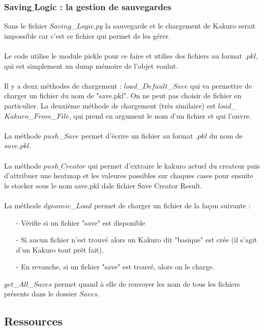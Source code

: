 \documentclass[french,12pt]{article}
\begin{document}
\subsubsection{Saving$\_$Logic : la gestion de sauvegardes}
Sans le fichier $Saving$\_$Logic.py$ la sauvegarde et le chargement de Kakuro serait impossible car c'est ce fichier qui permet de les gérer. \\ \\
Le code utilise le module pickle pour ce faire et utilise des fichiers au format $.pkl$, qui est simplement un dump mémoire de l'objet voulut.  \\ \\
Il y a deux méthodes de chargement : $load$\_$Default$\_$Save$ qui va permettre de charger un fichier du nom de "save.pkl". On ne peut pas choisir de fichier en particulier. La deuxième méthode de chargement (très similaire) est $load$\_$Kakuro$\_$From$\_$File$, qui prend en argument le nom d'un fichier et qui l'ouvre. \\ \\
La méthode $push$\_$Save$ permet d'écrire un fichier au format $.pkl$ du nom de $save.pkl$. \\ \\
La méthode $push\_Creator$ qui permet d'extraire le kakuro  actuel du createur puis d'attribuer une heatmap et les valeures possibles sur chaques cases pour ensuite le stocker sous le nom save.pkl dale fichier Save Creator Result. \\ \\ 
La méthode $dynamic$\_$Load$ permet de charger un fichier de la façon suivante : \\
\begin{enumerate}
\item[-] Vérifie si un fichier "save" est disponible\\
\item[-] Si aucun fichier n'est trouvé alors un Kakuro dit "basique" est crée (il s'agit d'un Kakuro tout prêt fait). \\
\item[-] En revanche, si un fichier "save" est trouvé, alors on le charge.\\
\end{enumerate}

$get$\_$All$\_$Saves$ permet quand à elle de renvoyer les nom de tous les fichiers présents dans le dossier $Saves$.
\subsection{Ressources}
\end{document}
